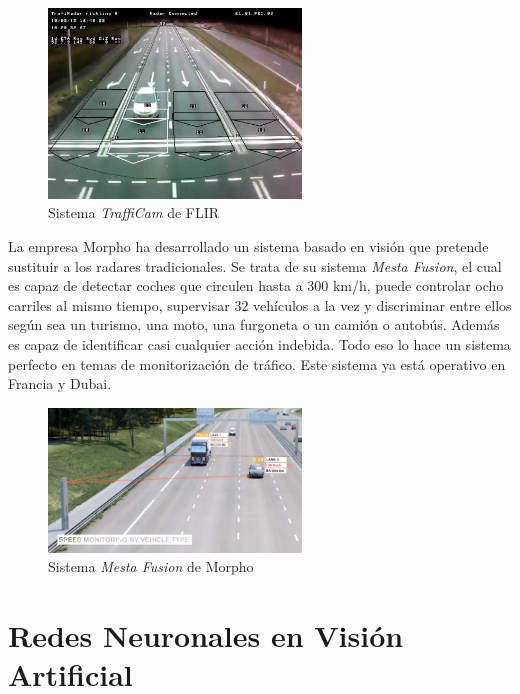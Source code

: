 \begin{figure}[H]
  \begin{center}
    \includegraphics[width=0.6\textwidth]{figures/Introduccion/flir.jpg}
		\caption{Sistema \textit{TraffiCam} de FLIR}
		\label{fig.flir}
		\end{center}
\end{figure}

La empresa Morpho ha desarrollado un sistema basado en visión que pretende sustituir a los radares tradicionales. Se trata de su sistema \textit{Mesta Fusion}, el cual es capaz de detectar coches que circulen hasta a 300 km/h, puede controlar ocho carriles al mismo tiempo, supervisar 32 vehículos a la vez y discriminar entre ellos según sea un turismo, una moto, una furgoneta o un camión o autobús. Además es capaz de identificar casi cualquier acción indebida.  Todo eso lo hace un sistema perfecto en temas de monitorización de tráfico. Este sistema ya está operativo en Francia y Dubai.

\begin{figure}[H]
  \begin{center}
    \includegraphics[width=0.6\textwidth]{figures/Introduccion/mesta_fusion.jpg}
		\caption{Sistema \textit{Mesta Fusion} de Morpho}
		\label{fig.mesta_fusion}
		\end{center}
\end{figure}

\section{Redes Neuronales en Visión Artificial}

